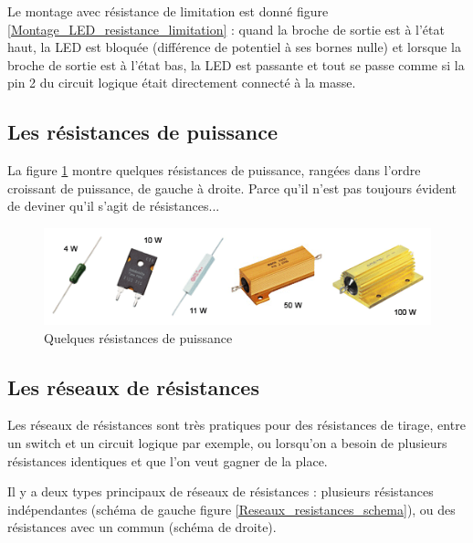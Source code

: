 \documentclass[a4paper]{article}
\begin{document}
Le montage avec résistance de limitation est donné figure \ref{Montage_LED_resistance_limitation} : quand la broche de sortie est à l'état haut, la \ac{LED} est bloquée (différence de potentiel à ses bornes nulle) et lorsque la broche de sortie est à l'état bas, la \ac{LED} est passante et tout se passe comme si la pin 2 du circuit logique était directement connecté à la masse.

\subsection{Les résistances de puissance}

La figure \ref{Resistances_puissance} montre quelques résistances de puissance, rangées dans l'ordre croissant de puissance, de gauche à droite. Parce qu'il n'est pas toujours évident de deviner qu'il s'agit de résistances...

\begin{figure}[H]
	\centering
	\includegraphics[scale=0.75]{Images/Resistances_puissance.png}
	\caption{Quelques résistances de puissance
		\label{Resistances_puissance}}
\end{figure}

\subsection{Les réseaux de résistances}

Les réseaux de résistances sont très pratiques pour des résistances de tirage, entre un switch et un circuit logique par exemple, ou lorsqu'on a besoin de plusieurs résistances identiques et que l'on veut gagner de la place.

Il y a deux types principaux de réseaux de résistances : plusieurs résistances indépendantes (schéma de gauche figure \ref{Reseaux_resistances_schema}), ou des résistances avec un commun (schéma de droite).
\end{document}
